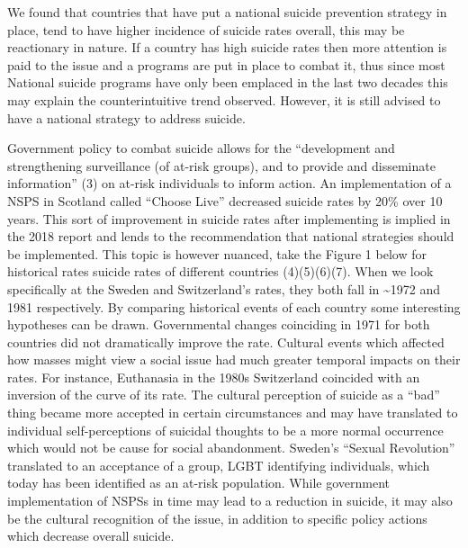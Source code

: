 \documentclass[]{article}
\begin{document}
We found that countries that have put a national suicide prevention
strategy in place, tend to have higher incidence of suicide rates
overall, this may be reactionary in nature. If a country has high
suicide rates then more attention is paid to the issue and a programs
are put in place to combat it, thus since most National suicide programs
have only been emplaced in the last two decades this may explain the
counterintuitive trend observed. However, it is still advised to have a
national strategy to address suicide.

Government policy to combat suicide allows for the ``development and
strengthening surveillance (of at-risk groups), and to provide and
disseminate information'' (3) on at-risk individuals to inform action.
An implementation of a NSPS in Scotland called ``Choose Live'' decreased
suicide rates by 20\% over 10 years. This sort of improvement in suicide
rates after implementing is implied in the 2018 report and lends to the
recommendation that national strategies should be implemented. This
topic is however nuanced, take the Figure 1 below for historical rates
suicide rates of different countries (4)(5)(6)(7). When we look
specifically at the Sweden and Switzerland's rates, they both fall in
\textasciitilde{}1972 and 1981 respectively. By comparing historical
events of each country some interesting hypotheses can be drawn.
Governmental changes coinciding in 1971 for both countries did not
dramatically improve the rate. Cultural events which affected how masses
might view a social issue had much greater temporal impacts on their
rates. For instance, Euthanasia in the 1980s Switzerland coincided with
an inversion of the curve of its rate. The cultural perception of
suicide as a ``bad'' thing became more accepted in certain circumstances
and may have translated to individual self-perceptions of suicidal
thoughts to be a more normal occurrence which would not be cause for
social abandonment. Sweden's ``Sexual Revolution'' translated to an
acceptance of a group, LGBT identifying individuals, which today has
been identified as an at-risk population. While government
implementation of NSPSs in time may lead to a reduction in suicide, it
may also be the cultural recognition of the issue, in addition to
specific policy actions which decrease overall suicide.
\end{document}
